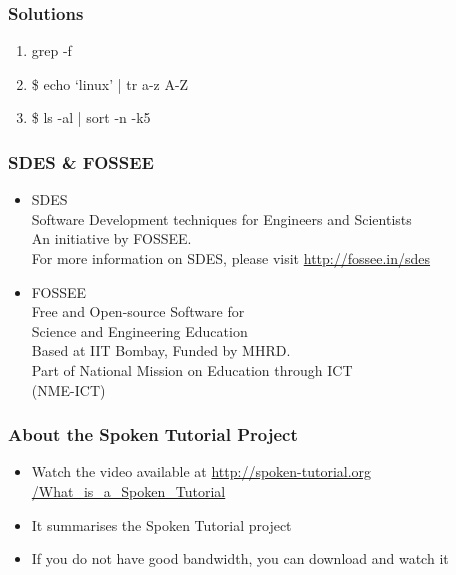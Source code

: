 \documentclass[17pt,compress]{beamer}
\begin{document}
\begin{frame}
\frametitle{Solutions}
\label{sec-10}


\begin{enumerate}
\item grep -f
\vspace{15pt}
\item \$ echo `linux' | tr a-z A-Z
\vspace{15pt}
\item \$ ls -al | sort -n -k5
\end{enumerate}
\end{frame}

\begin{frame}
\frametitle{SDES \& FOSSEE}
\begin{center}
\begin{itemize}
\item \small{SDES}\\
\small{\color{LimeGreen}Software Development techniques for Engineers and Scientists} \\
\scriptsize An initiative by FOSSEE. \\
\vspace{3pt}
\scriptsize For more information on SDES, please visit {\color{blue}\url{http://fossee.in/sdes}}\\
\vspace{10pt}
\item \small{FOSSEE}\\
\small {\color{LimeGreen}Free and Open-source Software for \\Science and Engineering Education} \\
\scriptsize Based at IIT Bombay, Funded by MHRD.\\
\vspace{3pt}
\scriptsize Part of National Mission on Education through ICT \\(NME-ICT) \\
\end{itemize}
\end{center}
\end{frame}

\begin{frame}
\frametitle{About the Spoken Tutorial Project}
\begin{itemize}
\item Watch the video available at {\color{blue}\url{http://spoken-tutorial.org /What\_is\_a\_Spoken\_Tutorial}} 
\item It summarises the Spoken Tutorial project 
\item If you do not have good bandwidth, you can download and watch it
\end{itemize}
\end{frame}
\end{document}
